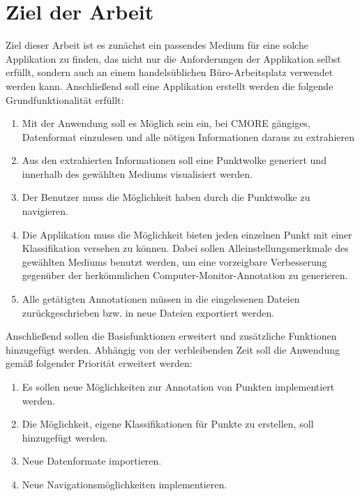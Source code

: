 \section{Ziel der Arbeit}
Ziel dieser Arbeit ist es zunächst ein passendes Medium für eine solche Applikation zu finden, das nicht nur die Anforderungen der Applikation selbst erfüllt, sondern auch an einem handelsüblichen Büro-Arbeitsplatz verwendet werden kann. Anschließend soll eine Applikation erstellt werden die folgende Grundfunktionalität erfüllt:\\

\begin{enumerate}
\item Mit der Anwendung soll es Möglich sein ein, bei CMORE gängiges, Datenformat einzulesen und alle nötigen Informationen daraus zu extrahieren

\item Aus den extrahierten Informationen soll eine Punktwolke generiert und innerhalb des gewählten Mediums visualisiert werden.

\item Der Benutzer muss die Möglichkeit haben durch die Punktwolke zu navigieren.

\item Die Applikation muss die Möglichkeit bieten jeden einzelnen Punkt mit einer Klassifikation versehen zu können. Dabei sollen Alleinstellungsmerkmale des gewählten Mediums benutzt werden, um eine vorzeigbare Verbesserung gegenüber der herkömmlichen Computer-Monitor-Annotation zu generieren. 

\item Alle getätigten Annotationen müssen in die eingelesenen Dateien zurückgeschrieben bzw. in neue Dateien exportiert werden.
\end{enumerate}

Anschließend sollen die Basisfunktionen erweitert und zusätzliche Funktionen hinzugefügt werden. Abhängig von der verbleibenden Zeit soll die Anwendung gemäß folgender Priorität erweitert werden:\\

\begin{enumerate}
\item Es sollen neue Möglichkeiten zur Annotation von Punkten implementiert werden.

\item Die Möglichkeit, eigene Klassifikationen für Punkte zu erstellen, soll hinzugefügt werden.

\item Neue Datenformate importieren.

\item Neue Navigationsmöglichkeiten implementieren.
\end{enumerate}

